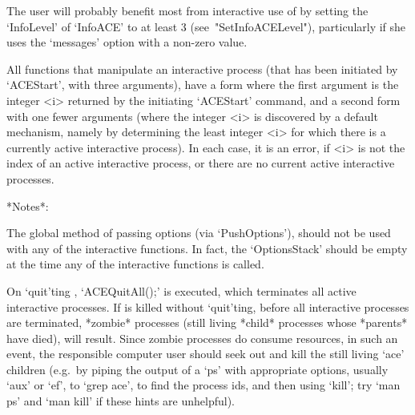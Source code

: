 

The user will probably benefit most from interactive use of {\ACE}  by
setting   the   `InfoLevel'   of   `InfoACE'    to    at    least    3
(see~"SetInfoACELevel"),  particularly  if  she  uses  the  `messages'
option with a non-zero value.

All functions that manipulate an interactive process  (that  has  been
initiated by `ACEStart', with three arguments), have a form where  the
first  argument  is  the  integer  <i>  returned  by  the   initiating
`ACEStart' command, and a second form with one fewer arguments  (where
the integer <i> is  discovered  by  a  default  mechanism,  namely  by
determining the least integer <i>  for  which  there  is  a  currently
active interactive {\ACE} process). In each case, it is an  error,  if
<i> is not the index of an active interactive process, or there are no
current active interactive processes.

*Notes*: 

The global method of passing options (via `PushOptions'),  should  not
be  used  with  any  of  the  interactive  functions.  In  fact,   the
`OptionsStack' should be empty at the  time  any  of  the  interactive
functions is called.

On `quit'ting {\GAP}, `ACEQuitAll();' is  executed,  which  terminates
all active interactive {\ACE} processes. If {\GAP} is  killed  without
`quit'ting, before all interactive {\ACE}  processes  are  terminated,
*zombie* processes (still living  *child*  processes  whose  *parents*
have died), will result. Since zombie processes do consume  resources,
in such an event, the responsible computer user should  seek  out  and
kill the still living `ace' children (e.g.~by piping the output  of  a
`ps' with appropriate options, usually `aux' or `ef', to  `grep  ace',
to find the process ids, and then using `kill'; try `man ps' and  `man
kill' if these hints are unhelpful).

